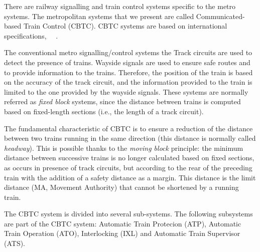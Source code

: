 \documentclass{ewic}
\begin{document}
There are railway signalling and train control systems specific to the metro systems. The metropolitan systems that we present are called Communicated-based Train Control (CBTC). CBTC systems are based on international specifications,~\cite{ieee1474} ~\cite{cei2007}.

The conventional metro signalling/control systems the Track circuits are used to detect the presence of trains. Wayside signals are used to ensure safe routes and to provide information to the trains. Therefore, the position of the train is based on the accuracy of the track circuit, and the information provided to the train is limited to the one provided by the wayside signals. These systems are normally referred as \emph{fixed block} systems, since the distance between trains is computed based on fixed-length sections (i.e., the length of a track circuit).


The fundamental characteristic of CBTC is to ensure a reduction of the distance between two trains running in the same direction (this distance is normally called \emph{headway}). This is possible thanks to the \emph{moving block} principle: the minimum distance between successive trains is no longer calculated based on fixed sections, as occurs in presence of track circuits, but according to the rear of the preceding train with the addition of a safety distance as a margin. This distance is the limit distance (MA, Movement Authority) that cannot be shortened by a running train. 


The CBTC system is divided into several sub-systems. The following subsystems are part of the CBTC system: Automatic Train Protecion (ATP), Automatic Train Operation (ATO), Interlocking (IXL) and Automatic Train Supervisor (ATS).

 
\end{document}
